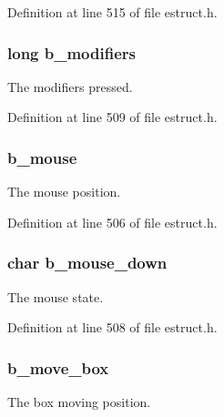 Definition at line 515 of file estruct.\-h.

\hypertarget{struct__edspbox_ad230697acdd2d00abb2dc18dd38089d8}{
\subsubsection[{b\-\_\-modifiers}]{\setlength{\rightskip}{0pt plus 5cm}long b\-\_\-modifiers}}\label{struct__edspbox_ad230697acdd2d00abb2dc18dd38089d8}
The modifiers pressed. 

Definition at line 509 of file estruct.\-h.

\hypertarget{struct__edspbox_a8831d355ec1dbb2dca9a68268a977965}{
\subsubsection[{b\-\_\-mouse}]{ b\-\_\-mouse}}\label{struct__edspbox_a8831d355ec1dbb2dca9a68268a977965}
The mouse position. 

Definition at line 506 of file estruct.\-h.

\hypertarget{struct__edspbox_a1dc439a4d35e98f78370c81ceadc8ea0}{
\subsubsection[{b\-\_\-mouse\-\_\-down}]{\setlength{\rightskip}{0pt plus 5cm}char b\-\_\-mouse\-\_\-down}}\label{struct__edspbox_a1dc439a4d35e98f78370c81ceadc8ea0}
The mouse state. 

Definition at line 508 of file estruct.\-h.

\hypertarget{struct__edspbox_a2b028829ae54f8ccede6bb0d5903f7fd}{
\subsubsection[{b\-\_\-move\-\_\-box}]{ b\-\_\-move\-\_\-box}}\label{struct__edspbox_a2b028829ae54f8ccede6bb0d5903f7fd}
The box moving position. 

